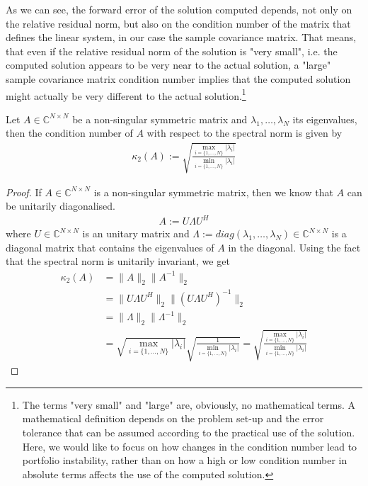 		As we can see, the forward error of the solution computed depends, not only on the relative residual norm, but also on the condition number of the matrix that defines the linear system, in our case the sample covariance matrix. That means, that even if the relative residual norm of the solution is "very small", i.e. the computed solution appears to be very near to the actual solution, a "large" sample covariance matrix condition number implies that the computed solution might actually be very different to the actual solution.\footnote{The terms "very small" and "large" are, obviously, no mathematical terms. A mathematical definition depends on the problem set-up and the error tolerance that can be assumed according to the practical use of the solution. Here, we would like to focus on how changes in the condition number lead to portfolio instability, rather than on how a high or low condition number in absolute terms affects the use of the computed solution.}
		
		\begin{theorem}\label{theorem:ConditionNumberEigenvalue}
		    Let $A \in \mathbb{C}^{N \times N}$ be a non-singular symmetric matrix and $\lambda_1, \dots, \lambda_N$ its eigenvalues, then the condition number of $A$ with respect to the spectral norm is given by
		    \begin{align*}
		        \kappa_2(A) := \sqrt{\frac{\max_{i = \{1, \dots, N \} } | \lambda_i |}{\min_{i = \{1, \dots, N \} } | \lambda_i |}}
		    \end{align*}
		\end{theorem}
		
		\begin{proof}
		    If $A \in \mathbb{C}^{N \times N}$ is a non-singular symmetric matrix, then we know that $A$ can be unitarily diagonalised.
		    \begin{align*}
		        A := U \Lambda U^H
		    \end{align*}
		    where $U \in \mathbb{C}^{N \times N}$ is an unitary matrix and $\Lambda := diag(\lambda_1, \dots, \lambda_N) \in \mathbb{C}^{N \times N}$ is a diagonal matrix that contains the eigenvalues of $A$ in the diagonal. Using the fact that the spectral norm is unitarily invariant, we get
		    \begin{align*}
		        \kappa_2(A) &= \| A \|_2 \| A^{-1} \|_2 \\
		        &= \| U \Lambda U^H \|_2 \| (U \Lambda U^H)^{-1} \|_2 \\
		        &= \| \Lambda \|_2 \| \Lambda^{-1} \|_2 \\
		        &= \sqrt{\max_{i = \{1, \dots, N \} } | \lambda_i |} \sqrt{\frac{1}{\min_{i = \{1, \dots, N \} } | \lambda_i |}} = \sqrt{\frac{\max_{i = \{1, \dots, N \} } | \lambda_i |}{\min_{i = \{1, \dots, N \} } | \lambda_i |}}
		    \end{align*}
		\end{proof}
		
